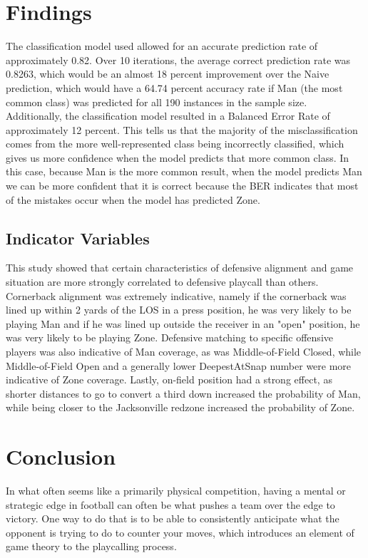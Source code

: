 \documentclass{article}
\begin{document}
\section{Findings}


The classification model used allowed for an accurate prediction rate of approximately 0.82. Over 10 iterations, the average correct prediction rate was 0.8263, which would be an almost 18 percent improvement over the Naive prediction, which would have a 64.74 percent accuracy rate if Man (the most common class) was predicted for all 190 instances in the sample size. Additionally, the classification model resulted in a Balanced Error Rate of approximately 12 percent. This tells us that the majority of the misclassification comes from the more well-represented class being incorrectly classified, which gives us more confidence when the model predicts that more common class. In this case, because Man is the more common result, when the model predicts Man we can be more confident that it is correct because the BER indicates that most of the mistakes occur when the model has predicted Zone. 

\subsection{Indicator Variables}

This study showed that certain characteristics of defensive alignment and game situation are more strongly correlated to defensive playcall than others. Cornerback alignment was extremely indicative, namely if the cornerback was lined up within 2 yards of the LOS in a press position, he was very likely to be playing Man and if he was lined up outside the receiver in an "open" position, he was very likely to be playing Zone. Defensive matching to specific offensive players was also indicative of Man coverage, as was Middle-of-Field Closed, while Middle-of-Field Open and a generally lower DeepestAtSnap number were more indicative of Zone coverage. Lastly, on-field position had a strong effect, as shorter distances to go to convert a third down increased the probability of Man, while being closer to the Jacksonville redzone increased the probability of Zone. 



\section{Conclusion}

In what often seems like a primarily physical competition, having a mental or strategic edge in football can often be what pushes a team over the edge to victory. One way to do that is to be able to consistently anticipate what the opponent is trying to do to counter your moves, which introduces an element of game theory to the playcalling process. 
\end{document}
